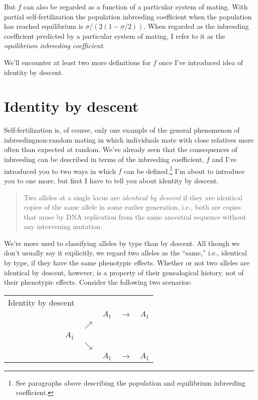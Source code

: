But $f$ can also be regarded as a function of a particular system of
mating. With partial self-fertilization the population inbreeding
coefficient when the population has reached equilibrium is
$\sigma/(2(1-\sigma/2))$. When regarded as the inbreeding coefficient
predicted by a particular system of mating, I refer to it as the {\it
  equilibrium inbreeding coefficient}.

We'll encounter at least two more definitions for $f$ once I've
introduced idea of identity by descent.

\section*{Identity by descent}

Self-fertilization is, of course, only one example of the general
phenomenon of inbreeding{\dash}non-random mating in which individuals
mate with close relatives more often than expected at random. We've
already seen that the consequences of inbreeding can be described in
terms of the inbreeding coefficient, $f$ and I've introduced you to
two ways in which $f$ can be defined.\footnote{See paragraphs above
describing the population and equilibrium inbreeding coefficient.} I'm
about to introduce you to one more, but first I have to tell you about
identity by descent.

\begin{quote}
  Two alleles at a single locus are {\it identical by descent\/} if
  they are identical copies of the same allele in some earlier
  generation, i.e., both are copies that arose by DNA replication from
  the same ancestral sequence without any intervening
  mutation.
\end{quote}

We're more used to classifying alleles by type than by descent. All
though we don't usually say it explicitly, we regard two alleles as
the ``same,'' i.e., identical by type,  if
they have the same phenotypic effects. Whether or not two alleles are
identical by descent, however, is a property of their genealogical
history, not of their phenotypic effects. Consider the following two
scenarios:

\begin{center}
\begin{tabular}{rcccc}
Identity by descent \\
      &            & $A_1$ & $\rightarrow$ & $A_1$ \\
      & $\nearrow$ &       &               & \\
$A_1$ &            &       &               & \\
      & $\searrow$ &       &               & \\
      &            & $A_1$ & $\rightarrow$ & $A_1$ 
\end{tabular}
\end{center}

